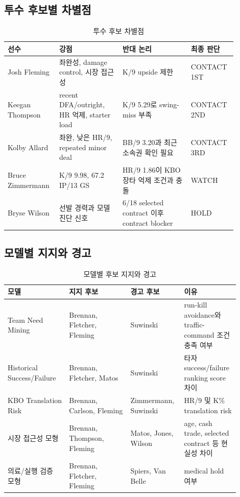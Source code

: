 \documentclass[11pt,a4paper]{article}
\begin{document}
\subsection{투수 후보별 차별점}
\begin{table}[H]
\centering
\caption{투수 후보 차별점}
\label{tab:pitcher_profiles}
\small
\begin{tabularx}{\linewidth}{L{0.18\linewidth}L{0.26\linewidth}L{0.28\linewidth}L{0.17\linewidth}}
\toprule
선수 & 강점 & 반대 논리 & 최종 판단 \\
\midrule
Josh Fleming & 좌완성, damage control, 시장 접근성 & K/9 upside 제한 & CONTACT 1ST \\
Keegan Thompson & recent DFA/outright, HR 억제, starter load & K/9 5.29로 swing-miss 부족 & CONTACT 2ND \\
Kolby Allard & 좌완, 낮은 HR/9, repeated minor deal & BB/9 3.20과 최근 소속권 확인 필요 & CONTACT 3RD \\
Bruce Zimmermann & K/9 9.98, 67.2 IP/13 GS & HR/9 1.86이 KBO 장타 억제 조건과 충돌 & WATCH \\
Bryse Wilson & 선발 경력과 모델 진단 신호 & 6/18 selected contract 이후 contract blocker & HOLD \\
\bottomrule
\end{tabularx}
\end{table}

\subsection{모델별 지지와 경고}
\begin{table}[H]
\centering
\caption{모델별 후보 지지와 경고}
\label{tab:model_support}
\small
\begin{tabularx}{\linewidth}{L{0.25\linewidth}L{0.25\linewidth}L{0.20\linewidth}L{0.20\linewidth}}
\toprule
모델 & 지지 후보 & 경고 후보 & 이유 \\
\midrule
Team Need Mining & Brennan, Fletcher, Fleming & Suwinski & run-kill avoidance와 traffic-command 조건 충족 여부 \\
Historical Success/Failure & Brennan, Fletcher, Matos & Suwinski & 타자 success/failure ranking score 차이 \\
KBO Translation Risk & Brennan, Carlson, Fleming & Zimmermann, Suwinski & HR/9 및 K\% translation risk \\
시장 접근성 모형 & Brennan, Thompson, Fleming & Matos, Jones, Wilson & age, cash trade, selected contract 등 현실성 차이 \\
의료/실행 검증 모형 & Brennan, Fletcher, Fleming & Spiers, Van Belle & medical hold 여부 \\
\bottomrule
\end{tabularx}
\end{table}
\end{document}
